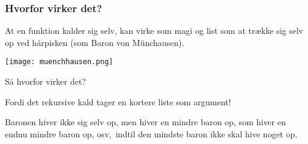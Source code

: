 \documentclass{beamer}
\begin{document}

\begin{frame}
\frametitle{Hvorfor virker det?}

At en funktion kalder sig selv, kan virke som magi og list som at
trække sig selv op ved hårpisken (som Baron von Münchausen).

\begin{center}
\texttt{[image: muenchhausen.png]}
\end{center}

Så hvorfor virker det?

\pause

\vspace{1ex}
Fordi det rekursive kald tager en kortere liste som argument!

\pause

\vspace{1ex}
Baronen hiver ikke sig selv op, men hiver en mindre baron op, som
hiver en endnu mindre baron op, osv,\ indtil den mindste baron ikke
skal hive noget op.
\end{frame}
\end{document}
